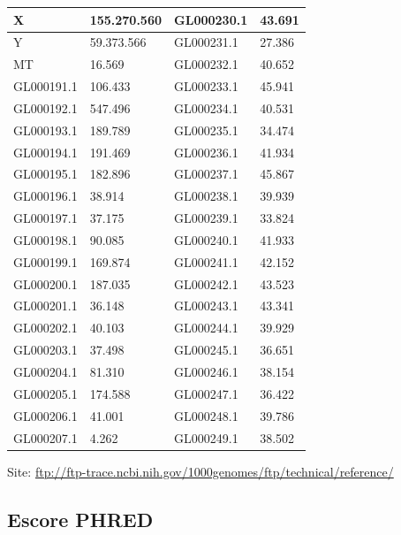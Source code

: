 {\begin{table}[p]
\begin{tabular}{|l|l|l|l|}
    X          & 155.270.560 & GL000230.1 & 43.691  \\ \hline
    Y          & 59.373.566  & GL000231.1 & 27.386  \\ \hline
    MT         & 16.569     & GL000232.1 & 40.652  \\ \hline
    GL000191.1 & 106.433    & GL000233.1 & 45.941  \\ \hline
    GL000192.1 & 547.496    & GL000234.1 & 40.531  \\ \hline
    GL000193.1 & 189.789    & GL000235.1 & 34.474  \\ \hline
    GL000194.1 & 191.469    & GL000236.1 & 41.934  \\ \hline
    GL000195.1 & 182.896    & GL000237.1 & 45.867  \\ \hline
    GL000196.1 & 38.914     & GL000238.1 & 39.939  \\ \hline
    GL000197.1 & 37.175     & GL000239.1 & 33.824  \\ \hline
    GL000198.1 & 90.085     & GL000240.1 & 41.933  \\ \hline
    GL000199.1 & 169.874    & GL000241.1 & 42.152  \\ \hline
    GL000200.1 & 187.035    & GL000242.1 & 43.523  \\ \hline
    GL000201.1 & 36.148     & GL000243.1 & 43.341  \\ \hline
    GL000202.1 & 40.103     & GL000244.1 & 39.929  \\ \hline
    GL000203.1 & 37.498     & GL000245.1 & 36.651  \\ \hline
    GL000204.1 & 81.310     & GL000246.1 & 38.154  \\ \hline
    GL000205.1 & 174.588    & GL000247.1 & 36.422  \\ \hline
    GL000206.1 & 41.001     & GL000248.1 & 39.786  \\ \hline
    GL000207.1 & 4.262      & GL000249.1 & 38.502  \\ \hline
    \end{tabular}

\label{b37_chrs}
\end{table}
\clearpage
}


Site: \url{ftp://ftp-trace.ncbi.nih.gov/1000genomes/ftp/technical/reference/}


\subsection{Escore PHRED}

